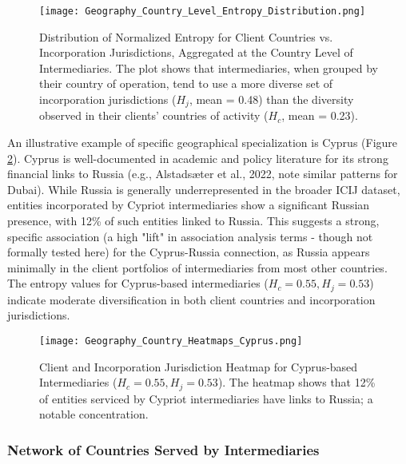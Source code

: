 \begin{figure}[htbp]
    \centering
    \texttt{[image: Geography\_Country\_Level\_Entropy\_Distribution.png]}
    \caption{Distribution of Normalized Entropy for Client Countries vs. Incorporation Jurisdictions, Aggregated at the Country Level of Intermediaries. The plot shows that intermediaries, when grouped by their country of operation, tend to use a more diverse set of incorporation jurisdictions ($H_j$, mean = 0.48) than the diversity observed in their clients' countries of activity ($H_c$, mean = 0.23).}
    \label{fig:geography_country_level_entropy_distribution}
\end{figure}

An illustrative example of specific geographical specialization is Cyprus (Figure \ref{fig:geography_country_heatmaps_cyprus}). Cyprus is well-documented in academic and policy literature for its strong financial links to Russia (e.g., Alstadsæter et al., 2022, note similar patterns for Dubai). While Russia is generally underrepresented in the broader ICIJ dataset, entities incorporated by Cypriot intermediaries show a significant Russian presence, with 12\% of such entities linked to Russia. This suggests a strong, specific association (a high "lift" in association analysis terms - though not formally tested here) for the Cyprus-Russia connection, as Russia appears minimally in the client portfolios of intermediaries from most other countries. The entropy values for Cyprus-based intermediaries ($H_c = 0.55, H_j = 0.53$) indicate moderate diversification in both client countries and incorporation jurisdictions.

\begin{figure}[htbp]
    \centering
    \texttt{[image: Geography\_Country\_Heatmaps\_Cyprus.png]}
    \caption{Client and Incorporation Jurisdiction Heatmap for Cyprus-based Intermediaries ($H_c=0.55, H_j=0.53$). The heatmap shows that 12\% of entities serviced by Cypriot intermediaries have links to Russia; a notable concentration.}
    \label{fig:geography_country_heatmaps_cyprus}
\end{figure}

\subsubsection{Network of Countries Served by Intermediaries}
\label{subsubsec:network_countries_served}

